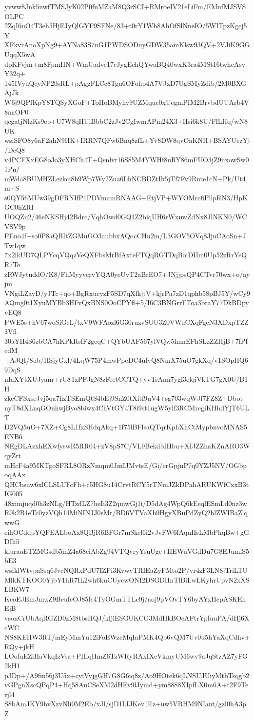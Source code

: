 yvww8Jnk5nwfTMSJyK02P0fnMZaM8Q3rSCI+RMroeIV21eLiFm/EMnfMJSVSOLPC
2ZqI6uO4T3eh5HjEJyQlGYF9SFNe/83+t0rY1Wh8AhOfSlNneIO/5WITpzKgcj5Y
XFkvrAnoXpNg9+AYNa83S7nG1PWDSODuyGDW35amKlsw93QV+2VJiK9GGUqqX5wA
dpKFvjm+m8FpmHN+WmUadve17eJygEchQYwaBQ40wxK3ra4MSt16twhcAsvY32q+
145IVyuQeyNP20sRL+pAggFLCc8Tgu6OFohp4A7VJxD7UgSMyZdib/2M0BXGAjJk
W6j9QPfKpY8TQSyXGoF+ToHoBMyhv9UZMquc0xUegmPIM2BrvbdUUArb4V8naOP0
qcgatjNlzKs9ep+U7W8qHUlBbbC2zJv2CgIwmAPm24X3+Hsi6k8U/FlLHq/wN8UK
wsiSFO8y6aF2ahN9HK+IRRN7QFw6Bnq8zfL+Yv8DW8qvOaKNH+BSAYUczYj/DeQ8
v4PCFXxEG8oJo3yXHCh4T+Qsnlvr16S85M4YWHf8uRY86mFUO3jZ9nxowSw01Pn/
mWda8BUMHZLezkcj8b9Wp7Wy2Zua6LhNCBDZtIh5jTf7Fv9Rnte1cN+Pk/Ut4m+S
s0QY56MUw39gDFRNIfP1PDVmamRNAAG+EtjVP+WYOMrcfiPllpRN3/HpKGC0hZRI
UOQZu2/46eNKSHj42Bdrc/VqhOwd0GQ1Z2biqUH6rWxuwZdNx8JlNKN0/WCVSV9p
PEno4f+so0P8aQBItZGMuGO3aubbxAQocCHu2m/L3GOV5OVq8JjuCAoSn+JTw1qw
7x2ikUD7QLPYcqVQqzVeQXFbsMrBfAxteFTQqRGTDqBoiDIIm0Up52zRrYeQR7Te
zRWJytuddO/K8/FhMyyvcrvYQA0yeUvT2aBrEO7+JNjjpsQP4CTvr70wx+o/ayjm
VNgiLZayD/yJTc+qo+BgRxucyzF5SD7qXfkjtV+kjrPa7zD1qphb58pBJ5Y/wCy9
AQmg0t1XyuMYBb3HFvQxBNS0OoCPYfl+5/I6C3BNGrrFToa3braY77DkBDpyvEQ8
PWE5s+hV67woSiGcL/txV9WFAozl6G30ruzvSUU3Z0VWuCXqFgeN3XDxpTZZ3Vfl
30aYH4S6zbCA7hKPkRsfF2geqC+QYbUAF567ylVQw5lmnEFhSLzZZHjB+7fPfcdM
+AJQI/8ub/HSjyGxl/4LqW75P4mwPpeDC4ufyQ8NmX75uO7gkXq/v1SOpHQ69DqS
nIaXYtXUJyanr+rU8TzPFJgN8zFeetCCTQ+yvTsAnn7ygl3elqiVkTG7gX0U/B1H
zkeCFSxseJvj5qa7hzTSEmQtS4bEj9SnZ0tXitf9uV4+sg703wqWJf7FZ8Z+Dbot
nyT8dXLnqGOuhwjByo8biwx4ChVtGY4T8i9st1ugW5ylf3RCMrcgiKHhdYjT6ULT
D2VQ5uO+7XZ+Cg8L1fxSHdqAkq+1f75lBFlsaQTqrKphXhCtMypbnvoMNAS5ENB6
NEgDLAzxhEXwfyswR5RR04+zV8pS7C/VL9BekdbIHbu+XIJZZhaKZnARO3WqyZrt
mHcF4a9MKTgoSFRL8ORzNmqm0JmIJMvtsE/Gi/erGpjnP7q0YZJ5NV/OGbpoqAAx
QHCbsuw6xlCLSLUFcFh+c5HG8u14CrvtRCY5rTNmJZkDPahARUKWfCxxB3tIG005
48ximjuqd0h3zNLg/HTzdLZ7heIi3Z2qmwGj1i/D5dAg4WpQ6kEeqlESmLd0nz3w
R0k2B1eTc0yzVQh14MiNINJJ0sMr/BD6VTVaXb9HgyXBuPdZyQ2hlZWIBaZlqwwG
eihOCddpYQPEALboAx8QBjR6BFGr7mSkcl6i2vJvFW6fAquHsLMbPhqBw+gGDIh5
kluraoETZMGsdb5mZ4a68eiAbZg94VTQvryYsuUgc+HEWuVGdDu7G8EJumlS5bE3
wsfklWtvpaSsq6JvcNQRxPdU7IZPi3KvwvTRIEaZyFMto2P/vr4zF3LN8jTriLTU
MlkKTKOG0YjbY1hR7IL2wh6kuCUycwONI2DSGDHnTlBiLwLKyhrUpvN2xXSLBKW7
KcoEJBmJnrxZ9BeufcOJ85fc4TyOGmTTLc9j/aoj9pVOvTY6byAYxHcpASKEhEjB
vsonCrUbAqRGZD0zM8tbsHQJ/kljiESGUKCG3MdHkBOcAFtrYpfuuPA/dHj6XcWC
NS8KEHW3RT/mEyMmYu12iFoEWzcMqIaPMK4Qb6vQM7Uv0u5hYaXqCdhv+RQy+jkH
LOofuEZiHaVkqIzVsa+PHlqHmZ6TzWRyRAxIXcVkmyUM6wv9aJqStzAZ7yFG2kH1
p3Dp+/A9fm56j3U5x+cyiVyjgGH7G8G6iq8z/Ao9HOtek6qLNSUJUiyMtbTsqgb2
vGPgnXscQPqP4+Hq58AuCSeXM2dHEv9lJymd+ym8888XIpfLX0m6A+t2F9Terjl4
S8bAmJKY9bvXzvNli0M2Eb/xJl/sjD1LIJKev1Ez+uw5VRHM9NIant/gzl0hA3pZ
